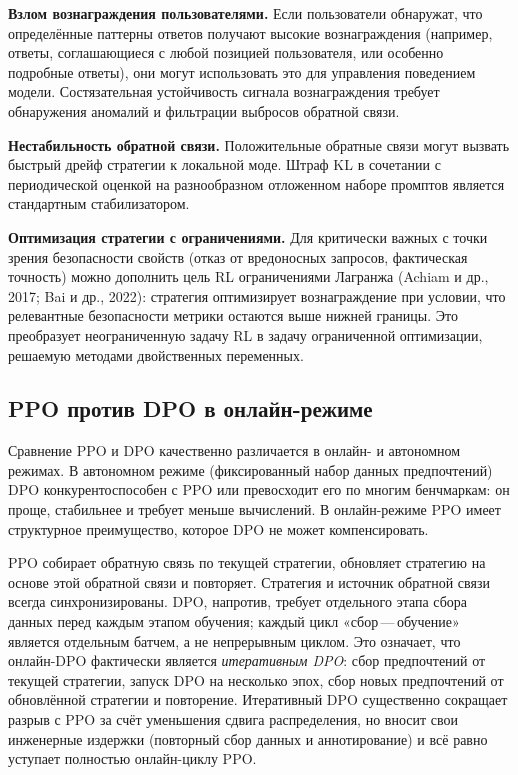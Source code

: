 \textbf{Взлом вознаграждения пользователями.} Если пользователи обнаружат, что определённые паттерны ответов получают высокие вознаграждения (например, ответы, соглашающиеся с любой позицией пользователя, или особенно подробные ответы), они могут использовать это для управления поведением модели. Состязательная устойчивость сигнала вознаграждения требует обнаружения аномалий и фильтрации выбросов обратной связи.

\textbf{Нестабильность обратной связи.} Положительные обратные связи могут вызвать быстрый дрейф стратегии к локальной моде. Штраф KL в сочетании с периодической оценкой на разнообразном отложенном наборе промптов является стандартным стабилизатором.

\textbf{Оптимизация стратегии с ограничениями.} Для критически важных с точки зрения безопасности свойств (отказ от вредоносных запросов, фактическая точность) можно дополнить цель RL ограничениями Лагранжа (Achiam и др., 2017; Bai и др., 2022): стратегия оптимизирует вознаграждение при условии, что релевантные безопасности метрики остаются выше нижней границы. Это преобразует неограниченную задачу RL в задачу ограниченной оптимизации, решаемую методами двойственных переменных.

\subsection{PPO против DPO в онлайн-режиме}

Сравнение PPO и DPO качественно различается в онлайн- и автономном режимах. В автономном режиме (фиксированный набор данных предпочтений) DPO конкурентоспособен с PPO или превосходит его по многим бенчмаркам: он проще, стабильнее и требует меньше вычислений. В онлайн-режиме PPO имеет структурное преимущество, которое DPO не может компенсировать.

PPO собирает обратную связь по текущей стратегии, обновляет стратегию на основе этой обратной связи и повторяет. Стратегия и источник обратной связи всегда синхронизированы. DPO, напротив, требует отдельного этапа сбора данных перед каждым этапом обучения; каждый цикл «сбор\,---\,обучение» является отдельным батчем, а не непрерывным циклом. Это означает, что онлайн-DPO фактически является \emph{итеративным DPO}: сбор предпочтений от текущей стратегии, запуск DPO на несколько эпох, сбор новых предпочтений от обновлённой стратегии и повторение. Итеративный DPO существенно сокращает разрыв с PPO за счёт уменьшения сдвига распределения, но вносит свои инженерные издержки (повторный сбор данных и аннотирование) и всё равно уступает полностью онлайн-циклу PPO.


